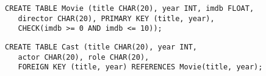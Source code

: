 
\newsavebox\SimplifiedMovieTableDDL
\begin{lrbox}{\SimplifiedMovieTableDDL}\begin{minipage}{0.9\textwidth}
\begin{lstlisting}[style=SQL]
CREATE TABLE Movie (title CHAR(20), year INT, imdb FLOAT, 
   director CHAR(20), PRIMARY KEY (title, year), 
   CHECK(imdb >= 0 AND imdb <= 10));
\end{lstlisting}
\end{minipage}
\end{lrbox}


\newsavebox\SimplifiedCastTableDDL
\begin{lrbox}{\SimplifiedCastTableDDL}\begin{minipage}{\textwidth}
\begin{lstlisting}[style=SQL]
CREATE TABLE Cast (title CHAR(20), year INT, 
   actor CHAR(20), role CHAR(20), 
   FOREIGN KEY (title, year) REFERENCES Movie(title, year);
\end{lstlisting}
\end{minipage}
\end{lrbox}